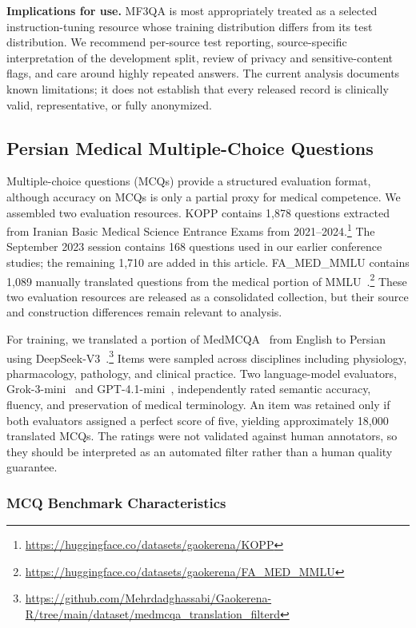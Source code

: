 \documentclass[manuscript,screen,review]{acmart}
\begin{document}
\textbf{Implications for use.} MF3QA is most appropriately treated as a selected instruction-tuning resource whose training distribution differs from its test distribution. We recommend per-source test reporting, source-specific interpretation of the development split, review of privacy and sensitive-content flags, and care around highly repeated answers. The current analysis documents known limitations; it does not establish that every released record is clinically valid, representative, or fully anonymized.

\subsection{Persian Medical Multiple-Choice Questions}\label{subsec3.3}

Multiple-choice questions (MCQs) provide a structured evaluation format, although accuracy on MCQs is only a partial proxy for medical competence. We assembled two evaluation resources. KOPP contains 1,878 questions extracted from Iranian Basic Medical Science Entrance Exams from 2021--2024.\footnote{\url{https://huggingface.co/datasets/gaokerena/KOPP}} The September 2023 session contains 168 questions used in our earlier conference studies; the remaining 1,710 are added in this article. FA\_MED\_MMLU contains 1,089 manually translated questions from the medical portion of MMLU~\cite{b26}.\footnote{\url{https://huggingface.co/datasets/gaokerena/FA_MED_MMLU}} These two evaluation resources are released as a consolidated collection, but their source and construction differences remain relevant to analysis.

For training, we translated a portion of MedMCQA~\cite{b28} from English to Persian using DeepSeek-V3~\cite{b27}.\footnote{\url{https://github.com/Mehrdadghassabi/Gaokerena-R/tree/main/dataset/medmcqa_translation_filterd}} Items were sampled across disciplines including physiology, pharmacology, pathology, and clinical practice. Two language-model evaluators, Grok-3-mini~\cite{b29} and GPT-4.1-mini~\cite{b30}, independently rated semantic accuracy, fluency, and preservation of medical terminology. An item was retained only if both evaluators assigned a perfect score of five, yielding approximately 18,000 translated MCQs. The ratings were not validated against human annotators, so they should be interpreted as an automated filter rather than a human quality guarantee.

\subsubsection{MCQ Benchmark Characteristics}\label{subsubsec:mcq_analysis}
\end{document}
